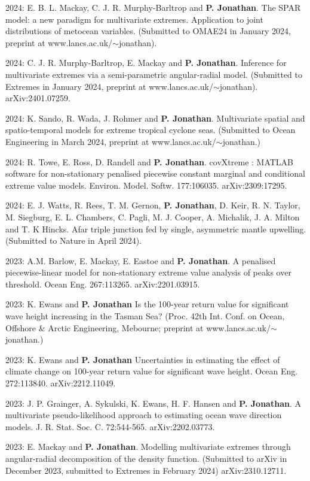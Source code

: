\documentclass[11pt,a4paper]{moderncv}
\begin{document}
2024: E. B. L. Mackay, C. J. R. Murphy-Barltrop and \textbf{P. Jonathan}. The SPAR model: a new paradigm for multivariate extremes. Application to joint distributions of metocean variables. (Submitted to OMAE24 in January 2024, preprint at www.lancs.ac.uk/$\sim$jonathan).

2024: C. J. R. Murphy-Barltrop, E. Mackay and \textbf{P. Jonathan}. Inference for multivariate extremes via a semi-parametric angular-radial model. (Submitted to Extremes in January 2024, preprint at www.lancs.ac.uk/$\sim$jonathan).  arXiv:2401.07259.

2024: K. Sando, R. Wada, J. Rohmer and \textbf{P. Jonathan}. Multivariate spatial and spatio-temporal models for extreme tropical cyclone seas. (Submitted to Ocean Engineering in March 2024, preprint at www.lancs.ac.uk/$\sim$jonathan.)

2024: R. Towe, E. Ross, D. Randell and \textbf{P. Jonathan}. covXtreme : MATLAB software for non-stationary penalised piecewise constant marginal and conditional extreme value models. Environ. Model. Softw. 177:106035. arXiv:2309:17295.

2024: E. J. Watts, R. Rees, T. M. Gernon, \textbf{P. Jonathan}, D. Keir, R. N. Taylor, M. Siegburg, E. L. Chambers, C. Pagli, M. J. Cooper, A. Michalik, J. A. Milton and T. K Hincks. Afar triple junction fed by single, asymmetric mantle upwelling. (Submitted to Nature in April 2024).

2023:  A.M. Barlow, E. Mackay, E. Eastoe and \textbf{P. Jonathan}. A penalised piecewise-linear model for non-stationary extreme value analysis of peaks over threshold. Ocean Eng. 267:113265. arXiv:2201.03915.

2023: K. Ewans and \textbf{P. Jonathan} Is the 100-year return value for significant wave height increasing in the Tasman Sea? (Proc. 42th Int. Conf. on Ocean, Offshore \& Arctic Engineering, Mebourne; preprint at  www.lancs.ac.uk/$\sim$jonathan.)

2023: K. Ewans and \textbf{P. Jonathan} Uncertainties in estimating the effect of climate change on 100-year return value for significant wave height. Ocean Eng. 272:113840. arXiv:2212.11049.

2023: J. P. Grainger, A. Sykulski, K. Ewans, H. F. Hansen and \textbf{P. Jonathan}. A multivariate pseudo-likelihood approach to estimating ocean wave direction models. J. R. Stat. Soc. C. 72:544-565.  arXiv:2202.03773.

2023: E. Mackay and \textbf{P. Jonathan}. Modelling multivariate extremes through angular-radial decomposition of the density function. (Submitted to arXiv in December 2023, submitted to Extremes in February 2024) arXiv:2310.12711.
\end{document}
